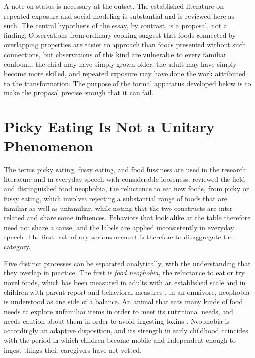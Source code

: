 \documentclass[11pt]{article}
\theoremstyle{remark}
\begin{document}
A note on status is necessary at the outset. The established literature on repeated exposure and social modeling is substantial and is reviewed here as such. The central hypothesis of the essay, by contrast, is a proposal, not a finding. Observations from ordinary cooking suggest that foods connected by overlapping properties are easier to approach than foods presented without such connections, but observations of this kind are vulnerable to every familiar confound: the child may have simply grown older, the adult may have simply become more skilled, and repeated exposure may have done the work attributed to the transformation. The purpose of the formal apparatus developed below is to make the proposal precise enough that it can fail.

\section{Picky Eating Is Not a Unitary Phenomenon}\label{sec:disagg}

The terms picky eating, fussy eating, and food fussiness are used in the research literature and in everyday speech with considerable looseness. \citet{dovey2008food} reviewed the field and distinguished food neophobia, the reluctance to eat new foods, from picky or fussy eating, which involves rejecting a substantial range of foods that are familiar as well as unfamiliar, while noting that the two constructs are inter-related and share some influences. Behaviors that look alike at the table therefore need not share a cause, and the labels are applied inconsistently in everyday speech. The first task of any serious account is therefore to disaggregate the category.

Five distinct processes can be separated analytically, with the understanding that they overlap in practice. The first is \emph{food neophobia}, the reluctance to eat or try novel foods, which has been measured in adults with an established scale \citep{pliner1992development} and in children with parent-report and behavioral measures \citep{pliner1994development}. In an omnivore, neophobia is understood as one side of a balance. An animal that eats many kinds of food needs to explore unfamiliar items in order to meet its nutritional needs, and needs caution about them in order to avoid ingesting toxins \citep{rozin1976selection}. Neophobia is accordingly an adaptive disposition, and its strength in early childhood coincides with the period in which children become mobile and independent enough to ingest things their caregivers have not vetted.
\end{document}

